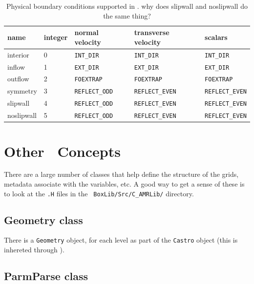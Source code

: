 \begin{table}
\renewcommand{\arraystretch}{1.5}
\centering
\begin{tabular}{lllll}
{\bf name} & {\bf integer} & {\bf normal velocity} & {\bf transverse velocity} & {\bf scalars} \\
\hline
interior & 0 & {\tt INT\_DIR} & {\tt INT\_DIR} & {\tt INT\_DIR} \\
inflow   & 1 & {\tt EXT\_DIR} & {\tt EXT\_DIR} & {\tt EXT\_DIR} \\
outflow  & 2 & {\tt FOEXTRAP} & {\tt FOEXTRAP} & {\tt FOEXTRAP} \\
symmetry & 3 & {\tt REFLECT\_ODD} & {\tt REFLECT\_EVEN} & {\tt REFLECT\_EVEN} \\
slipwall & 4 & {\tt REFLECT\_ODD} & {\tt REFLECT\_EVEN} & {\tt REFLECT\_EVEN} \\
noslipwall & 5 & {\tt REFLECT\_ODD} & {\tt REFLECT\_EVEN} & {\tt REFLECT\_EVEN} \\
\hline
\end{tabular}
\caption[Physics boundary conditions in \castro]
  {\label{table:castro:bcs} Physical boundary conditions supported in \castro.  {\color{red} why does slipwall and noslipwall do the same thing?}}
\renewcommand{\arraystretch}{1.0}
\end{table}





\section{Other \boxlib\ Concepts}

There are a large number of classes that help define the structure of
the grids, metadata associate with the variables, etc.  A good way to
get a sense of these is to look at the {\tt .H} files in the {\tt
  BoxLib/Src/C\_AMRLib/} directory.

\subsection{Geometry class}

There is a {\tt Geometry} object,  for each level as part of 
the {\tt Castro} object (this is inhereted through \amrlevel). 



\subsection{ParmParse class}

